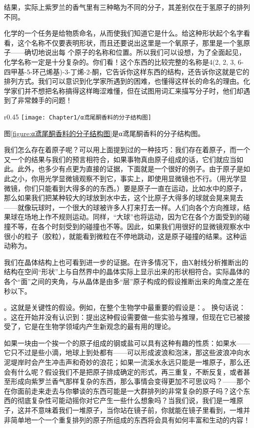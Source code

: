 结果，实际上紫罗兰的香气里有三种略为不同的分子，其差别仅在于氢原子的排列不同。

化学的一个任务是给物质命名，从而使我们知道它是什么。给这种形状起个名字看看，这个名称不仅要表明形状，而且还要说出这里是一个氧原子，那里是一个氢原子——确切地说出每 个原子的名称和位置。所以我们可以设想，为了全面起见，化学名称一定是十分复杂的。你们看！这个东西的比较完整的名称是4(2, 2, 3, 6-四甲基-5-环己烯基)-3-丁烯-2-酮，它告诉你这样东西的结构，还告诉你这就是它的排列方式。我们可以意识到化学家所遇到的困难，也懂得这样长的命名的理由。化学家们并不想把名称搞得这样晦涩难懂，但在试图用词汇来描写分子时，他们却遇到了非常棘手的问题！

\begin{wrapfigure}{r}{0.45\textwidth}
    \centering
    \texttt{[image: Chapter1/α鸢尾酮香料的分子结构图]}
    \caption{α鸢尾酮香料的分子结构图}
    \label{figure:α鸢尾酮香料的分子结构图}
\end{wrapfigure}
图\ref{figure:α鸢尾酮香料的分子结构图}是α鸢尾酮香料的分子结构图。

我们怎么存在着原子呢？可以用上面提到过的一种技巧：我们存在着原子，而一个又一个的结果与我们的预言相符合，如果事物真由原子组成的话，它们就应当如此。此外，也多少有点更为直接的证据，下面就是一个很好的例子。由于原子是如此之小，你用光学显微镜观察不到它，事实上，即使用显微镜也不行。（用光学显微镜，你们只能看到大得多的的东西。）要是原子一直在运动，比如水中的原子，那么如果我们把某种较大的球放到水中去，这个比原子大得多的球就会晃来晃去——就像玩球时，一个很大的球被许多人打来打去一样。人们向各个方向推球，结果球在场地上作不规则运动。同样，“大球”也将运动，因为它在各个方面受到的碰撞不等，在各个时刻受到的碰撞也不等。因此，如果我们用很好的显微镜观察水中很小的粒子（胶粒），就能看到微粒在不停地跳动，这是原子碰撞的结果。这种运动称为。

我们在晶体结构上也可看到进一步的证据。在许多情况下，由X射线分析推断出的结构在空间“形状”上与自然界中的晶体实际上显示出来的形状相符合。实际晶体的各个“面”之间的夹角，与从晶体是由多“层”原子构成的假设推断出来的角度之差在秒以下。

。这就是关键性的假设。例如，在整个生物学中最重要的假设是：。 换句话说： 。这在开始并没有认识到：提出这种假设需要做一些实验与推理，但现在它已被接受了，它是在生物学领域内产生新观念的最有用的理论。

如果一块由一个挨一个的原子组成的钢或盐可以具有这种有趣的性质：如果水——它只不过是些小滴，地球上到处都有——可以形成波浪和泡沫，那这些波浪冲向水泥堤岸时会产生冲击声和奇妙的浪花；如果一流溪水永远只能是一堆原子，那么还会有什么呢？假设我们不是把原子排成确定的形式，再三重复，不断反复，或者甚至形成向紫罗兰香气那样复杂的东西，那么事情会变得更加不可思议吗？——那个在你面前走来走去与你攀谈的东西可能是一大群排列的非常复杂的原子吗？这个东西的彻底复杂性可能动摇你对它产生一些什么想象吗？当我们说，我们是一堆原子，这并不意味着我们一堆原子，当你站在镜子前，你就能在镜子里看到，一堆并非简单地一个一个重复排列的原子所组成的东西将会具有如何丰富和生动的内容！
